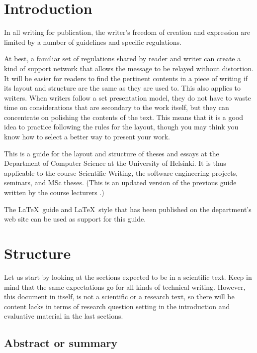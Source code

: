 
\chapter{Introduction}


In all writing for publication, the writer's freedom of creation and expression are limited by a number of guidelines and specific regulations.

At best, a familiar set of regulations shared by reader and writer can create a kind of support network that allows the message to be relayed without distortion. It will be easier for readers to find 
the pertinent contents in a piece of writing if its layout and structure are the same as they are used to. This also applies to writers. When writers follow a set presentation model, 
they do not have to waste time on considerations that are secondary to the work itself, but they can concentrate on polishing the contents of the text. This means that it is a good 
idea to practice following the rules for the layout, though you may think you know how to select a better way to present your work.

This is a guide for the layout and structure of theses and essays at the Department of Computer Science at the University of Helsinki. It is thus applicable to the course 
Scientific Writing, the software engineering projects, seminars, and MSc theses. (This is an updated version of 
the previous guide written by the course lecturers \citep{erkio01, erkiomakela96, erkio94, verkamo92}.)

The \LaTeX\ guide and \LaTeX\ style that has been  published on the department's web site can be used as support for this guide.


\chapter{Structure}

Let us start by looking at the sections expected to be in a scientific text. Keep in mind that the same expectations go for all kinds of technical writing.
However, this document in itself, is not a scientific or a research
text, so there will be content lacks in terms of research question
setting in the introduction and evaluative material in the last sections.

\section{Abstract or summary}


